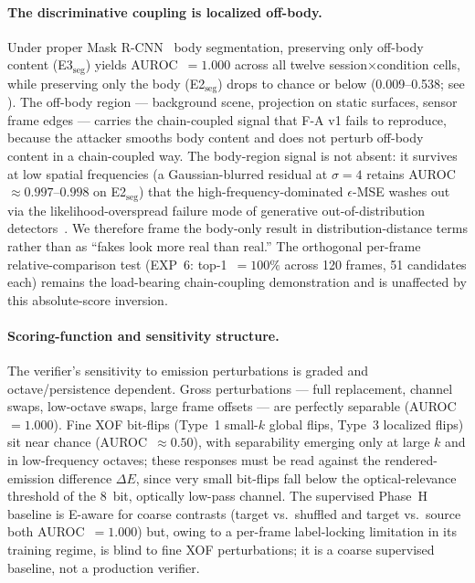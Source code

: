 \paragraph{The discriminative coupling is localized off-body.}
Under proper Mask R-CNN~\cite{he2017maskrcnn} body segmentation, preserving only off-body content (E3$_{\mathrm{seg}}$) yields AUROC~$=1.000$ across all twelve session$\times$condition cells, while preserving only the body (E2$_{\mathrm{seg}}$) drops to chance or below (\numrange{0.009}{0.538}; see ). The off-body region --- background scene, projection on static surfaces, sensor frame edges --- carries the chain-coupled signal that F-A v1 fails to reproduce, because the attacker smooths body content and does not perturb off-body content in a chain-coupled way. The body-region signal is not absent: it survives at low spatial frequencies (a Gaussian-blurred residual at $\sigma=4$ retains AUROC~$\approx 0.997$--$0.998$ on E2$_{\mathrm{seg}}$) that the high-frequency-dominated $\epsilon$-MSE washes out via the likelihood-overspread failure mode of generative out-of-distribution detectors~\cite{nalisnick2019}. We therefore frame the body-only result in distribution-distance terms rather than as ``fakes look more real than real.'' The orthogonal per-frame relative-comparison test (EXP~6: top-1~$=100\%$ across 120 frames, 51 candidates each) remains the load-bearing chain-coupling demonstration and is unaffected by this absolute-score inversion.

\paragraph{Scoring-function and sensitivity structure.}
The verifier's sensitivity to emission perturbations is graded and octave/persistence dependent. Gross perturbations --- full replacement, channel swaps, low-octave swaps, large frame offsets --- are perfectly separable (AUROC~$=1.000$). Fine XOF bit-flips (Type~1 small-$k$ global flips, Type~3 localized flips) sit near chance (AUROC~$\approx 0.50$), with separability emerging only at large $k$ and in low-frequency octaves; these responses must be read against the rendered-emission difference $\Delta E$, since very small bit-flips fall below the optical-relevance threshold of the \SI{8}{bit}, optically low-pass channel. The supervised Phase~H baseline is E-aware for coarse contrasts (target vs.\ shuffled and target vs.\ source both AUROC~$=1.000$) but, owing to a per-frame label-locking limitation in its training regime, is blind to fine XOF perturbations; it is a coarse supervised baseline, not a production verifier.


